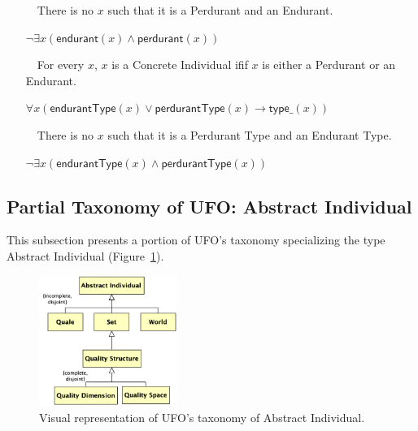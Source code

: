 \documentclass{article}
\newcommand{\AxLabel}{a}
\newcounter{cntax}
\newcommand{\myax}[1]{\refstepcounter{cntax}{\bf \small \AxLabel\thecntax}\label{#1}$\,\,\,\,$}
\newcommand{\me}[1]{\textsf{#1}}
\begin{document}
\begin{itemize}
    \item[\myax{ax_concreteIndividual_partition}] There is no $x$ such that it is a \me{Perdurant} and an \me{Endurant}.
    
    $\neg \exists x(\textsf{endurant}(x)\wedge \textsf{perdurant}(x))$

    

    
    \item[\myax{ax_type_taxonomy}] For every $x$, $x$ is a \me{Concrete Individual} ifif $x$ is either a \me{Perdurant} or an \me{Endurant}.
    
    $\forall x(\textsf{endurantType}(x)\vee \textsf{perdurantType}(x)\rightarrow \textsf{type\_}(x))$

    


    \item[\myax{ax_type_partition}] There is no $x$ such that it is a \me{Perdurant Type} and an \me{Endurant Type}.
    
    $\neg \exists x(\textsf{endurantType}(x)\wedge \textsf{perdurantType}(x))$

    
\end{itemize}



\subsection{Partial Taxonomy of UFO: \me{Abstract Individual}}

This subsection presents a portion of UFO's taxonomy specializing the type \me{Abstract Individual} (Figure~\ref{fig:02_taxonomy_abstract_individual}).

\begin{figure}[ht]
    \centering
    \includegraphics[width=0.4\textwidth]{diagrams/Abstract_Individual_Diagram.png}
    \caption{Visual representation of UFO's taxonomy of \me{Abstract Individual}.}
    \label{fig:02_taxonomy_abstract_individual}
\end{figure}
\end{document}
